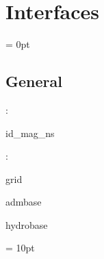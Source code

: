 
\section{Interfaces} 


\parskip = 0pt

\vspace{3mm} \subsection*{General}

: 

id\_mag\_ns
\vspace{2mm}

: 

grid

admbase

hydrobase
\vspace{2mm}

\vspace{5mm}\parskip = 10pt 
